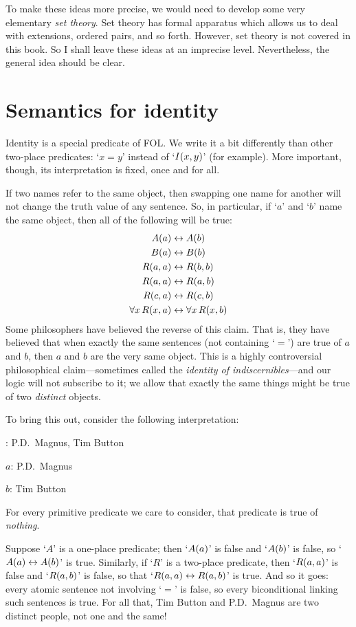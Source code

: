 To make these ideas more precise, we would need to develop some very elementary \emph{set theory}. Set theory has formal apparatus which allows us to deal with extensions, ordered pairs, and so forth. However, set theory is not covered in this book. So I shall leave these ideas at an imprecise level. Nevertheless, the general idea should be clear.


\section{Semantics for identity}
Identity is a special predicate of FOL. We write it a bit differently than other two-place predicates: `$x=y$' instead of `$\mathord{I}(x,y)$' (for example). More important, though, its interpretation is fixed, once and for all.

If two names refer to the same object, then swapping one name for another will not change the truth value of any sentence. So, in particular, if `$a$' and `$b$' name the same object, then all of the following will be true:\label{model.nonidentity}
	\begin{align*}
	 	\mathord{A}(a) &\leftrightarrow \mathord{A}(b) \\
	 	\mathord{B}(a) &\leftrightarrow \mathord{B}(b)\\
		\mathord{R}(a,a) &\leftrightarrow \mathord{R}(b,b)\\
		\mathord{R}(a,a) & \leftrightarrow \mathord{R}(a,b)\\
		\mathord{R}(c,a) &\leftrightarrow \mathord{R}(c,b)\\
		\forall x\, \mathord{R}(x,a) &\leftrightarrow \forall x\, \mathord{R}(x,b)
	\end{align*}
Some philosophers have believed the reverse of this claim. That is, they have believed that when exactly the same sentences (not containing `$=$') are true of $a$ and $b$, then $a$ and $b$ are the very same object. This is a highly controversial philosophical claim---sometimes called the \emph{identity of indiscernibles}---and our logic will not subscribe to it; we allow that exactly the same things might be true of two \emph{distinct} objects.  

To bring this out, consider the following interpretation:
	\begin{ebullet}
		\item[\text{domain}:] P.D.\ Magnus, Tim Button
		\item[$a$:] P.D.\ Magnus
		\item[$b$:] Tim Button
		\item For every primitive predicate we care to consider, that predicate is true of \emph{nothing}.
	\end{ebullet}
Suppose `$A$' is a one-place predicate; then `$\mathord{A}(a)$' is false and `$\mathord{A}(b)$' is false, so `$\mathord{A}(a) \leftrightarrow \mathord{A}(b)$' is true. Similarly, if `$R$' is a two-place predicate, then `$\mathord{R}(a,a)$' is false and `$\mathord{R}(a,b)$' is false, so that `$\mathord{R}(a,a) \leftrightarrow \mathord{R}(a,b)$' is true. And so it goes: every atomic sentence not involving `$=$' is false, so every biconditional linking such sentences is true. For all that, Tim Button and P.D.\ Magnus are two distinct people, not one and the same!


